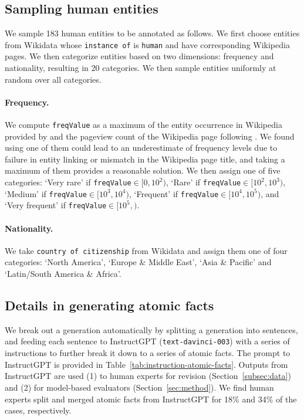 \subsection{Sampling human entities}\label{app:data-category}

We sample 183 human entities to be annotated as follows. We first choose entities from Wikidata whose \texttt{instance of} is \texttt{human} and have corresponding Wikipedia pages.
We then categorize entities based on two dimensions: frequency and nationality, resulting in 20 categories. We then sample entities uniformly at random over all categories.

\vspace{-.2em}
\paragraph{Frequency.}
We compute {\texttt{freqValue}} as a maximum of the entity occurrence in Wikipedia provided by \citet{kandpal2022large} and the pageview count of the Wikipedia page following \citet{mallen2022not}. We found using one of them could lead to an underestimate of frequency levels due to failure in entity linking or mismatch in the Wikipedia page title, and taking a maximum of them provides a reasonable solution.
We then assign one of five categories: 
{`Very rare'} if {\texttt{freqValue}}$ \in [0, 10^2)$,
{`Rare'} if {\texttt{freqValue}}$ \in [10^2, 10^3)$,
{`Medium'} if {\texttt{freqValue}}$ \in [10^3, 10^4)$,
{`Frequent'} if {\texttt{freqValue}}$ \in [10^4, 10^5)$, and
{`Very frequent'} if {\texttt{freqValue}}$ \in [10^5,)$.

\vspace{-.2em}
\paragraph{Nationality.} We take \texttt{country of citizenship} from Wikidata and assign them one of four categories: `North America', `Europe \& Middle East', `Asia \& Pacific' and `Latin/South America \& Africa'.

\subsection{Details in generating atomic facts}\label{app:atomic-fact-generation}
We break out a generation automatically by splitting a generation into sentences, and feeding each sentence to InstructGPT (\texttt{text-davinci-003}) with a series of instructions to further break it down to a series of atomic facts.
%
The prompt to InstructGPT is provided in Table~\ref{tab:instruction-atomic-facts}.
%
Outputs from InstructGPT are used (1) to human experts for revision (Section~\ref{subsec:data}) and (2) for model-based evaluators (Section~\ref{sec:method}).
%
We find human experts split and merged atomic facts from InstructGPT for 18\% and 34\% of the cases, respectively.

